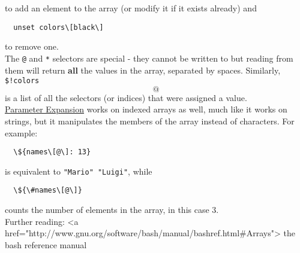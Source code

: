 \documentclass[hidelinks,12pt,a4paper,numbers=enddot]{scrartcl}
\begin{document}
to add an element to the array (or modify it if it exists already) and

\begin{verbatim}
  unset colors\[black\]
\end{verbatim}

to remove one.\\

The \texttt{@} and \texttt{*} selectors are special - they cannot be written to but
reading from them will return \textbf{all} the values in the array, separated by spaces.
Similarly, \texttt{\${!colors\[@\]}} is a list of
all the selectors (or indices) that were assigned a value.\\

\underline{\href{parameter\_expansion.html}{Parameter Expansion}} works on indexed arrays as well,
much like it works on strings, but it manipulates the members of the array instead of characters.
For example:

\begin{verbatim}
  \${names\[@\]: 13}
\end{verbatim}

is equivalent to \texttt{"Mario" "Luigi"}, while

\begin{verbatim}
  \${\#names\[@\]}
\end{verbatim}

counts the number of elements in the array, in this case 3.\\

Further reading: <a href="http://www.gnu.org/software/bash/manual/bashref.html\#Arrays">
the bash reference manual
\end{document}
